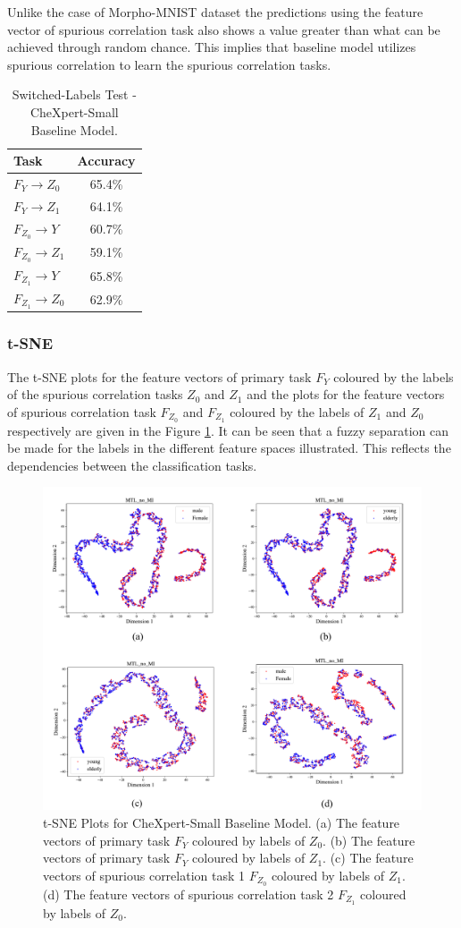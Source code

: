 \documentclass[12pt,DIV14,BCOR12mm,a4paper,footinclude=false,headinclude,parskip=half-,twoside,openright,cleardoublepage=empty,toc=index,bibliography=totoc,listof=totoc]{scrreprt}
\numberwithin{equation}{chapter}
\begin{document}
Unlike the case of Morpho-MNIST dataset the predictions using the feature vector of spurious correlation task also shows a value greater than what can be achieved through random chance. This implies that baseline model utilizes spurious correlation to learn the spurious correlation tasks.
\begin{table}[H]
\centering
\begin{tabular}{|l|c|}
\hline
\textbf{Task} & \textbf{Accuracy} \\
\hline
$F_Y \rightarrow Z_0$& 65.4\%\\
$F_Y \rightarrow Z_1$ & 64.1\%\\
\hline
$F_{Z_0} \rightarrow Y$& 60.7\%\\
$F_{Z_0} \rightarrow Z_1$ & 59.1\%\\
\hline
$F_{Z_1} \rightarrow Y$& 65.8\%\\
$F_{Z_1} \rightarrow Z_0$& 62.9\%\\
\hline
\end{tabular}
\caption{Switched-Labels Test - CheXpert-Small Baseline Model.}
\label{tab:accuracy_tasks-chx_baseline}
\end{table}

\subsubsection{t-SNE}
The t-SNE plots for the feature vectors of primary task $F_Y$ coloured by the labels of the spurious correlation tasks $Z_0$ and $Z_1$ and the plots for the feature vectors of spurious correlation task $F_{Z_0}$ and $F_{Z_1}$ coloured by the labels of $Z_1$ and $Z_0$ respectively are given in the Figure \ref{fig:tsne-chx-baseline}. It can be seen that a fuzzy separation can be made for the labels in the different feature spaces illustrated. This reflects the dependencies between the classification tasks.
\begin{figure}[H]
\centering
\includegraphics[width=0.7\linewidth]{thesis/figures/tsne_chx_baseline.pdf}
\caption{t-SNE Plots for CheXpert-Small Baseline Model. (a) The feature vectors of primary task $F_Y$ coloured by labels of $Z_0$. (b) The feature vectors of primary task $F_Y$ coloured by labels of $Z_1$. (c) The feature vectors of spurious correlation task 1 $F_{Z_0}$ coloured by labels of $Z_1$. (d) The feature vectors of spurious correlation task 2 $F_{Z_1}$ coloured by labels of $Z_0$.}
\label{fig:tsne-chx-baseline}
\end{figure}
\end{document}
